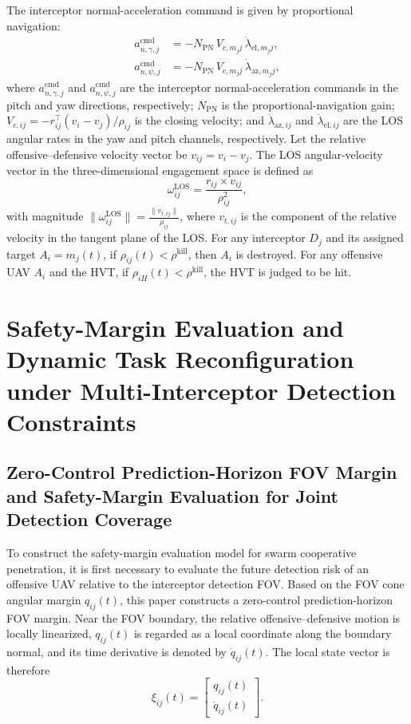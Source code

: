 \documentclass{cja}
\begin{document}
The interceptor normal-acceleration command is given by proportional navigation:
\begin{equation}
\begin{aligned}
a_{n,\gamma,j}^{\mathrm{cmd}}
&=-N_{\mathrm{PN}}\,V_{c,m_j j}\,\dot\lambda_{\mathrm{el},m_j j},\\
a_{n,\psi,j}^{\mathrm{cmd}}
&=-N_{\mathrm{PN}}\,V_{c,m_j j}\,\dot\lambda_{\mathrm{az},m_j j},
\end{aligned}
\label{eq:def-guid-pn}
\end{equation}
where $a_{n,\gamma,j}^{\mathrm{cmd}}$ and $a_{n,\psi,j}^{\mathrm{cmd}}$ are the interceptor normal-acceleration commands in the pitch and yaw directions, respectively; $N_{\mathrm{PN}}$ is the proportional-navigation gain; $V_{c,ij}=-r_{ij}^\top(v_i-v_j)/\rho_{ij}$ is the closing velocity; and $\dot\lambda_{\mathrm{az},ij}$ and $\dot\lambda_{\mathrm{el},ij}$ are the LOS angular rates in the yaw and pitch channels, respectively.
Let the relative offensive--defensive velocity vector be $v_{ij}=v_i-v_j$. The LOS angular-velocity vector in the three-dimensional engagement space is defined as
\begin{equation}
\omega_{ij}^{\mathrm{LOS}} = \frac{r_{ij}\times v_{ij}}{\rho_{ij}^2},
\label{eq:omega_ij_def}
\end{equation}
with magnitude $\|\omega_{ij}^{\mathrm{LOS}}\| = \frac{\|v_{t,ij}\|}{\rho_{ij}}$, where $v_{t,ij}$ is the component of the relative velocity in the tangent plane of the LOS.
For any interceptor $D_j$ and its assigned target $A_i=m_j(t)$, if $\rho_{ij}(t)<\rho^{\mathrm{kill}}$, then $A_i$ is destroyed. For any offensive UAV $A_i$ and the HVT, if $\rho_{iH}(t)<\rho^{\mathrm{kill}}$, the HVT is judged to be hit.

\section{Safety-Margin Evaluation and Dynamic Task Reconfiguration under Multi-Interceptor Detection Constraints}

\subsection{Zero-Control Prediction-Horizon FOV Margin and Safety-Margin Evaluation for Joint Detection Coverage}

To construct the safety-margin evaluation model for swarm cooperative penetration, it is first necessary to evaluate the future detection risk of an offensive UAV relative to the interceptor detection FOV. Based on the FOV cone angular margin $q_{ij}(t)$, this paper constructs a zero-control prediction-horizon FOV margin. Near the FOV boundary, the relative offensive--defensive motion is locally linearized, $q_{ij}(t)$ is regarded as a local coordinate along the boundary normal, and its time derivative is denoted by $\dot q_{ij}(t)$. The local state vector is therefore
\begin{equation}
\xi_{ij}(t)=
\begin{bmatrix}
q_{ij}(t)\\
\dot q_{ij}(t)
\end{bmatrix}.
\end{equation}
\end{document}
